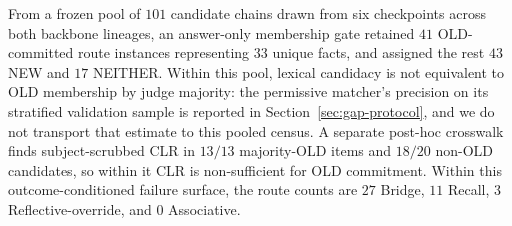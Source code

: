 \documentclass[letterpaper]{article} %
\begin{document}
From a frozen pool of \(101\) candidate chains drawn from six checkpoints across both backbone lineages, an answer-only membership gate retained \(41\) OLD-committed route instances representing \(33\) unique facts, and assigned the rest \(43\) NEW and \(17\) NEITHER. %
Within this pool, lexical candidacy is not equivalent to OLD membership by judge majority: the permissive matcher's precision on its stratified validation sample is reported in Section~\ref{sec:gap-protocol}, and we do not transport that estimate to this pooled census.  A separate post-hoc crosswalk finds subject-scrubbed CLR in \(13/13\) majority-OLD items and \(18/20\) non-OLD candidates, so within it CLR is non-sufficient for OLD commitment. %
Within this outcome-conditioned failure surface, the route counts are \(27\) Bridge, \(11\) Recall, \(3\) Reflective-override, and \(0\) Associative. %
\end{document}
